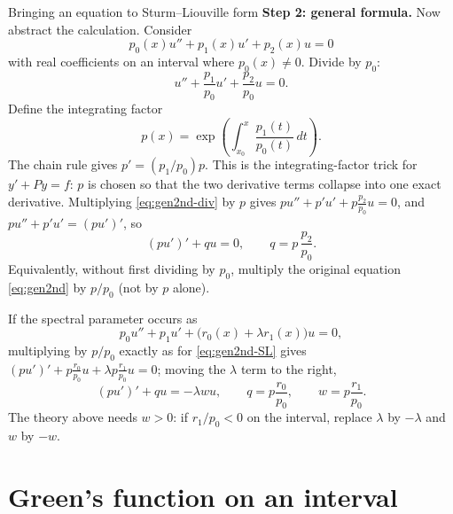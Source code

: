 \documentclass[11pt]{beamer}
\begin{document}
\begin{frame}[allowframebreaks=1.00]{Bringing an equation to Sturm--Liouville form}
\textbf{Step 2: general formula.}
Now abstract the calculation.  Consider
\begin{equation}
  p_0(x)u''+p_1(x)u'+p_2(x)u=0
  \label{eq:gen2nd}
\end{equation}
with real coefficients on an interval where $p_0(x)\neq0$.  Divide by $p_0$:
\begin{equation}
  u''+\frac{p_1}{p_0}u'+\frac{p_2}{p_0}u=0.
  \label{eq:gen2nd-div}
\end{equation}
Define the integrating factor
\begin{equation}
  p(x)=\exp\left(\int_{x_0}^{x}\frac{p_1(t)}{p_0(t)}\,dt\right).
  \label{eq:intfactor}
\end{equation}
The chain rule gives $p'=(p_1/p_0)p$. This is the integrating-factor trick for
$y'+Py=f$: $p$ is chosen so that the two derivative terms collapse into one exact
derivative. Multiplying \eqref{eq:gen2nd-div} by $p$ gives
$pu''+p'u'+p\frac{p_2}{p_0}u=0$, and $pu''+p'u'=(pu')'$, so
\begin{equation}
 (pu')'+qu=0,
 \qquad q=p\,\frac{p_2}{p_0}.
 \label{eq:gen2nd-SL}
\end{equation}
Equivalently, without first dividing by $p_0$, multiply the original equation
\eqref{eq:gen2nd} by $p/p_0$ (not by $p$ alone).

\par\framebreak\par
If the spectral parameter occurs as
\begin{equation}
  p_0u''+p_1u'+\bigl(r_0(x)+\lambda r_1(x)\bigr)u=0,
  \label{eq:gen-spectral}
\end{equation}
multiplying by $p/p_0$ exactly as for \eqref{eq:gen2nd-SL} gives
$(pu')'+p\frac{r_0}{p_0}u+\lambda p\frac{r_1}{p_0}u=0$; moving the $\lambda$ term
to the right,
\begin{equation}
  (pu')'+qu=-\lambda wu,
  \qquad
  q=p\frac{r_0}{p_0},
  \qquad
  w=p\frac{r_1}{p_0}.
  \label{eq:gen-spectral-SL}
\end{equation}
The theory above needs $w>0$: if $r_1/p_0<0$ on the interval, replace $\lambda$
by $-\lambda$ and $w$ by $-w$.
\end{frame}

\section{Green's function on an interval}
\end{document}
